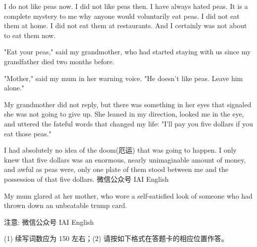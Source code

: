 \documentclass{英语试卷}
\begin{document}
\par I do not like peas now. I did not like peas then. I have always hated peas. It is a complete mystery to me why anyone would voluntarily eat peas. I did not eat them at home. I did not eat them at restaurants. And I certainly was not about to eat them now.\par
\par "Eat your peas," said my grandmother, who had started staying with us since my grandfather died two months before.\par
\par "Mother," said my mum in her warning voice. "He doesn't like peas. Leave him alone."\par
\par My grandmother did not reply, but there was something in her eyes that signaled she was not going to give up. She leaned in my direction, looked me in the eye, and uttered the fateful words that changed my life: "I'll pay you five dollars if you eat those peas."\par
\par I had absolutely no idea of the doom(厄运) that was going to happen. I only knew that five dollars was an enormous, nearly unimaginable amount of money, and awful as peas were, only one plate of them stood between me and the possession of that five dollars. 微信公众号 IAI English\par
\par My mum glared at her mother, who wore a self-satisfied look of someone who had thrown down an unbeatable trump card.\par
\par 注意: 微信公众号 IAI English\par
\par (1) 续写词数应为 150 左右；(2) 请按如下格式在答题卡的相应位置作答。\par
{}
\end{document}
